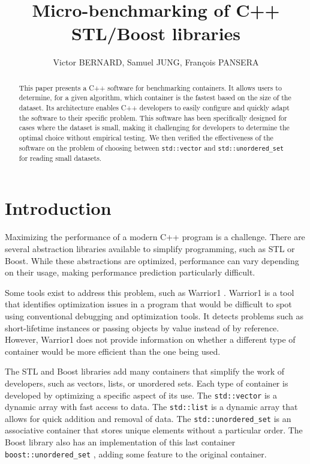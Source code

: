 \documentclass[conference]{IEEEtran}
\title{Micro-benchmarking of C++ STL/Boost libraries}
\author{Victor BERNARD, Samuel JUNG, François PANSERA}
\def\code#1{\texttt{#1}}
\begin{document}
\maketitle
	
\begin{abstract}
	
	This paper presents a C++ software for benchmarking containers. It allows users to determine, for a given algorithm, which container is the fastest based on the size of the dataset. Its architecture enables C++ developers to easily configure and quickly adapt the software to their specific problem. This software has been specifically designed for cases where the dataset is small, making it challenging for developers to determine the optimal choice without empirical testing. We then verified the effectiveness of the software on the problem of choosing between \code{std::vector} and \code{std::unordered\_set} for reading small datasets.

\end{abstract}

\section{Introduction}

Maximizing the performance of a modern C++ program is a challenge. There are several abstraction libraries available to simplify programming, such as STL or Boost. While these abstractions are optimized, performance can vary depending on their usage, making performance prediction particularly difficult.

Some tools exist to address this problem, such as Warrior1 \cite{arXiv:2010.09583}. Warrior1 is a tool that identifies optimization issues in a program that would be difficult to spot using conventional debugging and optimization tools. It detects problems such as short-lifetime instances or passing objects by value instead of by reference. However, Warrior1 does not provide information on whether a different type of container would be more efficient than the one being used.

The STL and Boost libraries add many containers that simplify the work of developers, such as vectors, lists, or unordered sets. Each type of container is developed by optimizing a specific aspect of its use. The \code{std::vector} \cite{stllibrary} is a dynamic array with fast access to data. The \code{std::list} \cite{stllibrary} is a dynamic array that allows for quick addition and removal of data. The \code{std::unordered\_set} \cite{stllibrary} is an associative container that stores unique elements without a particular order. The Boost library also has an implementation of this last container \code{boost::unordered\_set} \cite{boostlibrary}, adding some feature to the original container.
\end{document}
